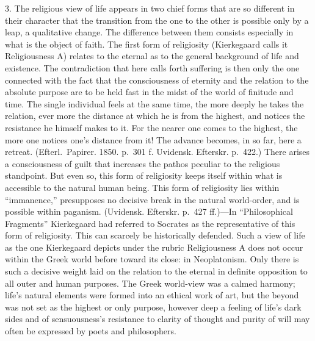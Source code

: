 \documentclass[12pt,a4paper]{book}
\newcommand{\opage}[1]{\marginnote{\footnotesize\textit{[#1]}}}
\begin{document}
3. The religious view of life appears in two chief forms that are so
different in their character that the transition from the one to the
other is possible only by a leap, a qualitative change. The difference
between them consists especially in what is the object of faith. The first
form of religiosity (Kierkegaard calls it Religiousness A) relates to the
eternal as to the general background of life and existence. The
contradiction that here calls forth suffering is then only the one
connected with the fact that the consciousness of eternity and the
relation to the absolute purpose are to be held fast in the midst of the
world of finitude and time. The single individual feels at the same time,
the more deeply he takes the relation, ever more the distance
\opage{117}at which he is from the highest, and notices the resistance he
himself makes to it. For the nearer one comes to the highest, the more one
notices one's distance from it! The advance becomes, in so far, here a
retreat.
(Efterl.\ Papirer. 1850. p.~301 f. Uvidensk. Efterskr. p.~422.) There
arises a consciousness of guilt that increases the pathos peculiar to the
religious standpoint. But even so, this form of religiosity keeps itself
within what is accessible to the natural human being. This form of
religiosity lies within ``immanence,'' presupposes no decisive break in
the natural world-order, and is possible within paganism. (Uvidensk.
Efterskr. p.~427 ff.)---In ``Philosophical Fragments'' Kierkegaard had
referred to Socrates as the representative of this form of religiosity.
This can scarcely be historically defended. Such a view of life as the one
Kierkegaard depicts under the rubric Religiousness A does not occur within
the Greek world before toward its close: in Neoplatonism. Only there is
such a decisive weight laid on the relation to the eternal in definite
opposition to all outer and human purposes. The Greek world-view was a
calmed harmony; life's natural elements were formed into an ethical work
of art, but the beyond was not set as the highest or only purpose, however
deep a feeling of life's dark sides and of sensuousness's resistance to
clarity of thought and purity of will may often be expressed by poets and
philosophers.
\end{document}
